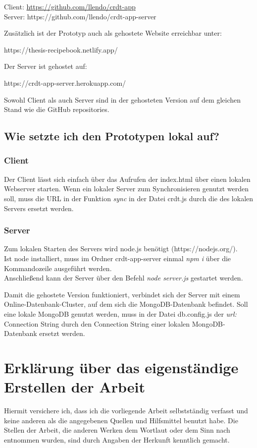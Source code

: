 \documentclass[a4paper, 12pt]{scrreprt}
\begin{document}
Client: \url{https://github.com/llendo/crdt-app}\\
Server: https://github.com/llendo/crdt-app-server


Zusätzlich ist der Prototyp auch als gehostete Website erreichbar unter: 

https://thesis-recipebook.netlify.app/

Der Server ist gehostet auf: 

https://crdt-app-server.herokuapp.com/


Sowohl Client als auch Server sind in der gehosteten Version auf dem gleichen Stand wie die GitHub repositories. 

\subsection*{Wie setzte ich den Prototypen lokal auf?}

\subsubsection*{Client}
Der Client lässt sich einfach über das Aufrufen der index.html über einen lokalen Webserver starten. Wenn ein lokaler Server zum Synchronisieren genutzt werden soll, muss die URL in der Funktion \textit{sync} in der Datei crdt.js durch die des lokalen Servers ersetzt werden.

\subsubsection*{Server}
Zum lokalen Starten des Servers wird node.js benötigt (https://nodejs.org/). \\
Ist node installiert, muss im Ordner crdt-app-server einmal \textit{npm i} über die Kommandozeile ausgeführt werden. \\
Anschließend kann der Server über den Befehl \textit{node server.js} gestartet werden.

Damit die gehostete Version funktioniert, verbindet sich der Server mit einem Online-Datenbank-Cluster, auf dem sich die MongoDB-Datenbank befindet. Soll eine lokale MongoDB genutzt werden, muss in der Datei db.config.js der \textit{url:} Connection String durch den Connection String einer lokalen MongoDB-Datenbank ersetzt werden. 

\thispagestyle{empty}
\newpage
\thispagestyle{empty}
\section*{Erklärung über das eigenständige Erstellen der Arbeit}
	Hiermit versichere ich, dass ich die vorliegende Arbeit selbstständig verfasst und keine anderen als die angegebenen Quellen und Hilfsmittel benutzt habe. Die Stellen der Arbeit, die anderen Werken dem Wortlaut oder dem Sinn nach entnommen wurden, sind durch Angaben der Herkunft kenntlich gemacht.
	
\end{document}
